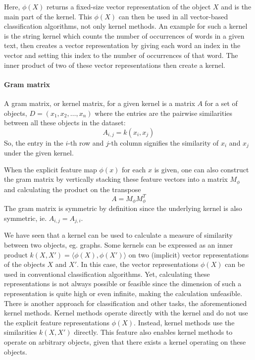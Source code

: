 Here, $\phi(X)$ returns a fixed-size vector representation of the object $X$ and is the main part of the kernel.
This $\phi(X)$ can then be used in all vector-based classification algorithms, not only kernel methods.
An example for such a kernel is the string kernel which counts the number of occurrences of words in a given text, then creates a vector representation by giving each word an index in the vector and setting this index to the number of occurrences of that word. The inner product of two of these vector representations then create a kernel.

\paragraph{Gram matrix}
A gram matrix, or kernel matrix, for a given kernel is a matrix $A$ for a set of objects, $D = (x_1, x_2, \ldots, x_n)$ where the entries are the pairwise similarities between all these objects in the dataset:
\begin{equation*}
A_{i,j} = k(x_i, x_j)
\end{equation*}
So, the entry in the $i$-th row and $j$-th column signifies the similarity of $x_i$ and $x_j$ under the given kernel.

When the explicit feature map $\phi(x)$ for each $x$ is given, one can also construct the gram matrix by vertically stacking these feature vectors into a matrix $M_{\phi}$ and calculating the product on the transpose
\begin{equation*}
A = M_{\phi} M_{\phi}^T
\end{equation*}
The gram matrix is symmetric by definition since the underlying kernel is also symmetric, ie. $A_{i,j} = A_{j, i}$.

We have seen that a kernel can be used to calculate a measure of similarity between two objects, eg. graphs.
Some kernels can be expressed as an inner product $k(X, X') = \langle \phi(X), \phi(X') \rangle$ on two (implicit) vector representations of the objects $X$ and $X'$.
In this case, the vector representations $\phi(X)$ can be used in conventional classification algorithms.
Yet, calculating these representations is not always possible or feasible since the dimension of such a representation is quite high or even infinite, making the calculation unfeasible.
There is another approach for classification and other tasks, the aforementioned kernel methods.
Kernel methods \cite[p.~291]{Bishop2006} operate directly with the kernel and do not use the explicit feature representations $\phi(X)$.
Instead, kernel methods use the similarities $k(X, X')$ directly.
This feature also enables kernel methods to operate on arbitrary objects, given that there exists a kernel operating on these objects.

